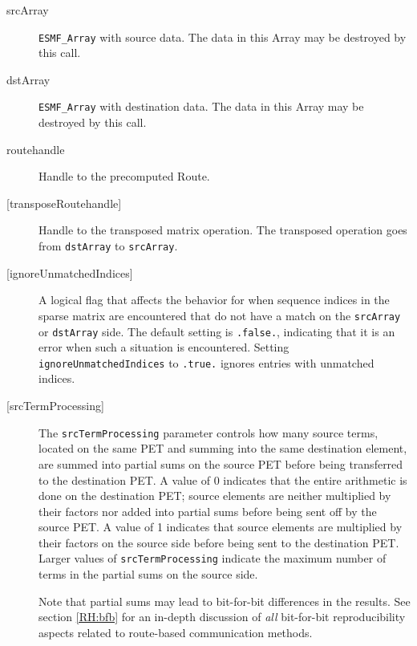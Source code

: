      \begin{description}
  
     \item [srcArray]
       {\tt ESMF\_Array} with source data. The data in this Array may be
       destroyed by this call.
  
     \item [dstArray]
       {\tt ESMF\_Array} with destination data. The data in this Array may be
       destroyed by this call.
  
     \item [routehandle]
       Handle to the precomputed Route.
  
     \item [{[transposeRoutehandle]}]
       Handle to the transposed matrix operation. The transposed operation goes
       from {\tt dstArray} to {\tt srcArray}.
       
     \item [{[ignoreUnmatchedIndices]}]
       A logical flag that affects the behavior for when sequence indices 
       in the sparse matrix are encountered that do not have a match on the 
       {\tt srcArray} or {\tt dstArray} side. The default setting is 
       {\tt .false.}, indicating that it is an error when such a situation is 
       encountered. Setting {\tt ignoreUnmatchedIndices} to {\tt .true.} ignores
       entries with unmatched indices.
  
     \item [{[srcTermProcessing]}]
       The {\tt srcTermProcessing} parameter controls how many source terms,
       located on the same PET and summing into the same destination element,
       are summed into partial sums on the source PET before being transferred
       to the destination PET. A value of 0 indicates that the entire arithmetic
       is done on the destination PET; source elements are neither multiplied 
       by their factors nor added into partial sums before being sent off by the
       source PET. A value of 1 indicates that source elements are multiplied
       by their factors on the source side before being sent to the destination
       PET. Larger values of {\tt srcTermProcessing} indicate the maximum number
       of terms in the partial sums on the source side.
  
       Note that partial sums may lead to bit-for-bit differences in the results.
       See section \ref{RH:bfb} for an in-depth discussion of {\em all}
       bit-for-bit reproducibility aspects related to route-based communication
       methods.
  

\end{description}
